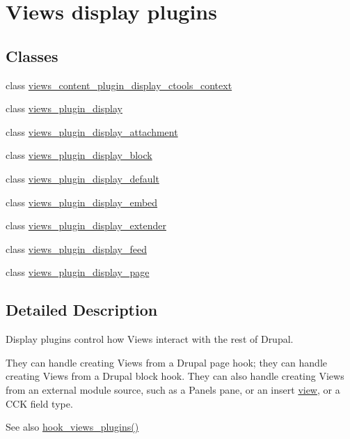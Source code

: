 \hypertarget{group__views__display__plugins}{
\section{Views display plugins}
\label{group__views__display__plugins}
}
\subsection*{Classes}
\begin{DoxyCompactItemize}
\item 
class \hyperlink{classviews__content__plugin__display__ctools__context}{views\_\-content\_\-plugin\_\-display\_\-ctools\_\-context}
\item 
class \hyperlink{classviews__plugin__display}{views\_\-plugin\_\-display}
\item 
class \hyperlink{classviews__plugin__display__attachment}{views\_\-plugin\_\-display\_\-attachment}
\item 
class \hyperlink{classviews__plugin__display__block}{views\_\-plugin\_\-display\_\-block}
\item 
class \hyperlink{classviews__plugin__display__default}{views\_\-plugin\_\-display\_\-default}
\item 
class \hyperlink{classviews__plugin__display__embed}{views\_\-plugin\_\-display\_\-embed}
\item 
class \hyperlink{classviews__plugin__display__extender}{views\_\-plugin\_\-display\_\-extender}
\item 
class \hyperlink{classviews__plugin__display__feed}{views\_\-plugin\_\-display\_\-feed}
\item 
class \hyperlink{classviews__plugin__display__page}{views\_\-plugin\_\-display\_\-page}
\end{DoxyCompactItemize}


\subsection{Detailed Description}
Display plugins control how Views interact with the rest of Drupal.

They can handle creating Views from a Drupal page hook; they can handle creating Views from a Drupal block hook. They can also handle creating Views from an external module source, such as a Panels pane, or an insert \hyperlink{classview}{view}, or a CCK field type.

\begin{DoxySeeAlso}{See also}
\hyperlink{group__views__hooks_ga23f6e9972b2ed84fc54b7ff63f44477d}{hook\_\-views\_\-plugins()} 
\end{DoxySeeAlso}
